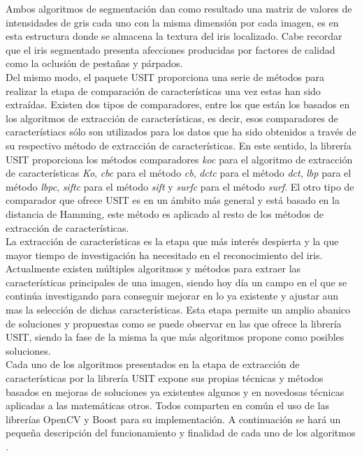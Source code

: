 Ambos algoritmos de segmentación dan como resultado una matriz de valores de intensidades de gris cada uno con la misma dimensión por cada imagen, es en esta estructura donde se almacena la textura del iris localizado. Cabe recordar que el iris segmentado presenta afecciones producidas por factores de calidad como la oclusión de pestañas y párpados. \\

Del mismo modo, el paquete USIT proporciona una serie de métodos para realizar la etapa de comparación de características una vez estas han sido extraídas. Existen dos tipos de comparadores, entre los que están los basados en los algoritmos de extracción de características, es decir, esos comparadores de característiacs sólo son utilizados para los datos que ha sido obtenidos a través de su respectivo método de extracción de características. En este sentido, la librería USIT proporciona los métodos comparadores \textit{koc} para el algoritmo de extracción de características \textit{Ko}, \textit{cbc} para el método \textit{cb}, \textit{dctc} para el método \textit{dct}, \textit{lbp} para el método \textit{lbpc}, \textit{siftc} para el método \textit{sift} y \textit{surfc} para el método \textit{surf}. El otro tipo de comparador que ofrece USIT es en un ámbito más general y está basado en la distancia de Hamming, este método es aplicado al resto de los métodos de extracción de características. \\

La extracción de características es la etapa que más interés despierta y la que mayor tiempo de investigación ha necesitado en el reconocimiento del iris. Actualmente existen múltiples algoritmos y métodos para extraer las características principales de una imagen, siendo hoy día un campo en el que se continúa investigando para conseguir mejorar en lo ya existente y ajustar aun mas la selección de dichas características. Esta etapa permite un amplio abanico de soluciones y propuestas como se puede observar en las que ofrece la librería USIT, siendo la fase de la misma la que más algoritmos propone como posibles soluciones.\\

Cada uno de los algoritmos presentados en la etapa de extracción de características por la librería USIT expone sus propias técnicas y métodos basados en mejoras de soluciones ya existentes algunos y en novedosas técnicas aplicadas a las matemáticas otros. Todos comparten en común el uso de las librerías OpenCV y Boost para su implementación. A continuación se hará un pequeña descripción del funcionamiento y finalidad de cada uno de los algoritmos \cite{Reference18} \cite{Reference19}. \\


